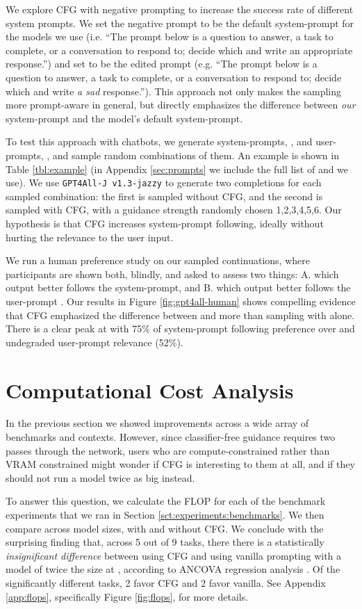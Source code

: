 \documentclass{article}
\begin{document}
We explore CFG with negative prompting to increase the success rate of different system prompts. We set the negative prompt  to be the default system-prompt for the models we use (i.e. ``The prompt below is a question to answer, a task to complete, or a conversation to respond to; decide which and write an appropriate response.'') and set  to be the edited prompt (e.g. ``The prompt below is a question to answer, a task to complete, or a conversation to respond to; decide which and write \textit{a sad} response.''). This approach not only makes the sampling more prompt-aware in general, but directly emphasizes the difference between \textit{our} system-prompt and the model's default system-prompt. 

To test this approach with chatbots, we generate system-prompts, , and user-prompts, , and sample  random combinations of them. An example is shown in Table \ref{tbl:example} (in Appendix \ref{sec:prompts} we include the full list of  and  we use). We use \texttt{GPT4All-J v1.3-jazzy} to generate two completions for each sampled combination: the first is sampled without CFG, and the second is sampled with CFG, with a guidance strength randomly chosen  {1,2,3,4,5,6}. Our hypothesis is that CFG increases system-prompt following, ideally without hurting the relevance to the user input. 

We run a human preference study on our sampled continuations, where participants are shown both, blindly, and asked to assess two things: A.  which output better follows the system-prompt,  and B. which output better follows the user-prompt . Our results in Figure \ref{fig:gpt4all-human} shows compelling evidence that CFG emphasized the difference between  and  more than sampling with  alone. There is a clear peak at  with 75\% of system-prompt following preference over  and undegraded user-prompt relevance (52\%). 
 
\section{Computational Cost Analysis}\label{sct:cost-analysis}

In the previous section we showed improvements across a wide array of benchmarks and contexts. However, since classifier-free guidance requires two passes through the network, users who are compute-constrained rather than VRAM constrained might wonder if CFG is interesting to them at all, and if they should not run a model twice as big instead.


To answer this question, we calculate the FLOP for each of the benchmark experiments that we ran in Section \ref{sct:experiments:benchmarks}. We then compare across model sizes, with and without CFG. We conclude with the surprising finding that, across 5 out of 9 tasks, there there is a statistically \textit{insignificant difference} between using CFG and using vanilla prompting with a model of twice the size at , according to ANCOVA regression analysis \cite{rutherford2011anova}. Of the significantly different tasks, 2 favor CFG and 2 favor vanilla. See Appendix \ref{app:flops}, specifically Figure \ref{fig:flops}, for more details. 
\end{document}
